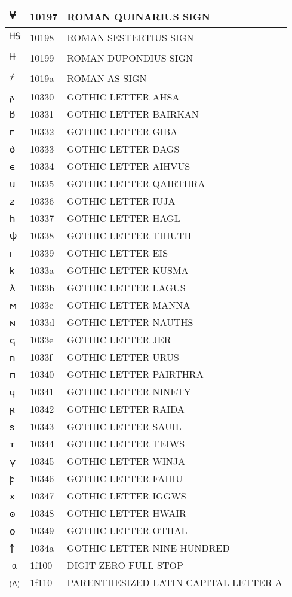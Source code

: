 \documentclass[12pt,letterpaper,openany]{book}
\begin{document}
\begin{center}
\begin{supertabular}{|m{0.25in}|m{0.5in}|m{4in}|}
𐆗 & 10197 & ROMAN QUINARIUS SIGN\\\hline
𐆘 & 10198 & ROMAN SESTERTIUS SIGN\\\hline
𐆙 & 10199 & ROMAN DUPONDIUS SIGN\\\hline
𐆚 & 1019a & ROMAN AS SIGN\\\hline
𐌰 & 10330 & GOTHIC LETTER AHSA\\\hline
𐌱 & 10331 & GOTHIC LETTER BAIRKAN\\\hline
𐌲 & 10332 & GOTHIC LETTER GIBA\\\hline
𐌳 & 10333 & GOTHIC LETTER DAGS\\\hline
𐌴 & 10334 & GOTHIC LETTER AIHVUS\\\hline
𐌵 & 10335 & GOTHIC LETTER QAIRTHRA\\\hline
𐌶 & 10336 & GOTHIC LETTER IUJA\\\hline
𐌷 & 10337 & GOTHIC LETTER HAGL\\\hline
𐌸 & 10338 & GOTHIC LETTER THIUTH\\\hline
𐌹 & 10339 & GOTHIC LETTER EIS\\\hline
𐌺 & 1033a & GOTHIC LETTER KUSMA\\\hline
𐌻 & 1033b & GOTHIC LETTER LAGUS\\\hline
𐌼 & 1033c & GOTHIC LETTER MANNA\\\hline
𐌽 & 1033d & GOTHIC LETTER NAUTHS\\\hline
𐌾 & 1033e & GOTHIC LETTER JER\\\hline
𐌿 & 1033f & GOTHIC LETTER URUS\\\hline
𐍀 & 10340 & GOTHIC LETTER PAIRTHRA\\\hline
𐍁 & 10341 & GOTHIC LETTER NINETY\\\hline
𐍂 & 10342 & GOTHIC LETTER RAIDA\\\hline
𐍃 & 10343 & GOTHIC LETTER SAUIL\\\hline
𐍄 & 10344 & GOTHIC LETTER TEIWS\\\hline
𐍅 & 10345 & GOTHIC LETTER WINJA\\\hline
𐍆 & 10346 & GOTHIC LETTER FAIHU\\\hline
𐍇 & 10347 & GOTHIC LETTER IGGWS\\\hline
𐍈 & 10348 & GOTHIC LETTER HWAIR\\\hline
𐍉 & 10349 & GOTHIC LETTER OTHAL\\\hline
𐍊 & 1034a & GOTHIC LETTER NINE HUNDRED\\\hline
🄀 & 1f100 & DIGIT ZERO FULL STOP\\\hline
🄐 & 1f110 & PARENTHESIZED LATIN CAPITAL LETTER A\\\hline

\end{supertabular}
\end{center}
\end{document}
